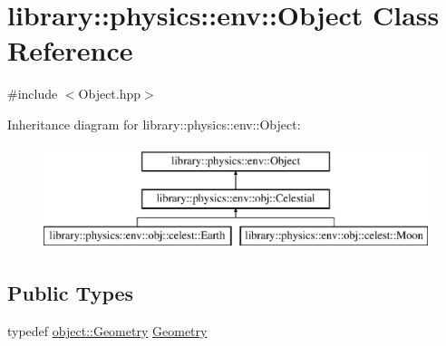 \hypertarget{classlibrary_1_1physics_1_1env_1_1_object}{}\section{library\+:\+:physics\+:\+:env\+:\+:Object Class Reference}
\label{classlibrary_1_1physics_1_1env_1_1_object}


{\ttfamily \#include $<$Object.\+hpp$>$}

Inheritance diagram for library\+:\+:physics\+:\+:env\+:\+:Object\+:\begin{figure}[H]
\begin{center}
\leavevmode
\includegraphics[height=3.000000cm]{classlibrary_1_1physics_1_1env_1_1_object}
\end{center}
\end{figure}
\subsection*{Public Types}
\begin{DoxyCompactItemize}
\item 
typedef \hyperlink{classlibrary_1_1physics_1_1env_1_1object_1_1_geometry}{object\+::\+Geometry} \hyperlink{classlibrary_1_1physics_1_1env_1_1_object_abdf50733c7ad97327fb64edca5670f13}{Geometry}
\end{DoxyCompactItemize}
